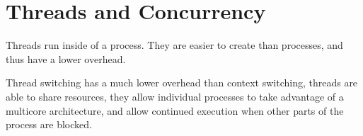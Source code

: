 \section{Threads and Concurrency}

Threads run inside of a process. They are easier to create than processes,
and thus have a lower overhead.

Thread switching has a much lower overhead than context switching, 
threads are able to share resources, they allow individual processes
to take advantage of a multicore architecture, and allow continued
execution when other parts of the process are blocked.







